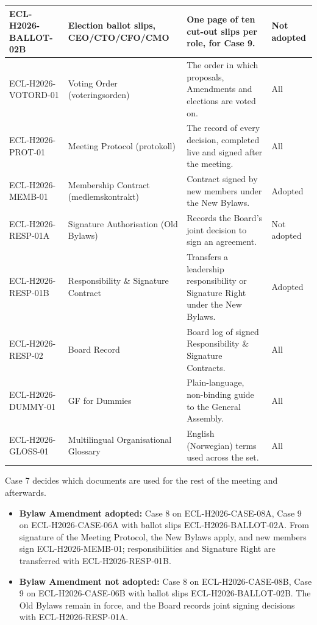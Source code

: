 \documentclass{../../../Common/Latex/Templates/rapport}
\begin{document}
\begin{longtable}{|L{3.2cm}|L{3.6cm}|L{5.3cm}|L{1.9cm}|}
  \hline
  ECL-H2026-BALLOT-02B & Election ballot slips, CEO/CTO/CFO/CMO         & One page of ten cut-out slips per role, for Case 9.                                           & Not adopted \\
  \hline
  ECL-H2026-VOTORD-01 & Voting Order (voteringsorden)                   & The order in which proposals, Amendments and elections are voted on.                          & All \\
  \hline
  ECL-H2026-PROT-01   & Meeting Protocol (protokoll)                    & The record of every decision, completed live and signed after the meeting.                    & All \\
  \hline
  ECL-H2026-MEMB-01   & Membership Contract (medlemskontrakt)           & Contract signed by new members under the New Bylaws.                                          & Adopted \\
  \hline
  ECL-H2026-RESP-01A  & Signature Authorisation (Old Bylaws)            & Records the Board's joint decision to sign an agreement.                                      & Not adopted \\
  \hline
  ECL-H2026-RESP-01B  & Responsibility \& Signature Contract            & Transfers a leadership responsibility or Signature Right under the New Bylaws.                & Adopted \\
  \hline
  ECL-H2026-RESP-02   & Board Record                                    & Board log of signed Responsibility \& Signature Contracts.                                     & All \\
  \hline
  ECL-H2026-DUMMY-01  & GF for Dummies                                  & Plain-language, non-binding guide to the General Assembly.                                    & All \\
  \hline
  ECL-H2026-GLOSS-01  & Multilingual Organisational Glossary            & English (Norwegian) terms used across the set.                                                & All \\
  \hline
\end{longtable}
\endgroup

Case 7 decides which documents are used for the rest of the meeting and afterwards.
\begin{itemize}
  \item \textbf{Bylaw Amendment adopted:} Case 8 on ECL-H2026-CASE-08A, Case 9 on ECL-H2026-CASE-06A with ballot slips ECL-H2026-BALLOT-02A. From signature of the Meeting Protocol, the New Bylaws apply, and new members sign ECL-H2026-MEMB-01; responsibilities and Signature Right are transferred with ECL-H2026-RESP-01B.
  \item \textbf{Bylaw Amendment not adopted:} Case 8 on ECL-H2026-CASE-08B, Case 9 on ECL-H2026-CASE-06B with ballot slips ECL-H2026-BALLOT-02B. The Old Bylaws remain in force, and the Board records joint signing decisions with ECL-H2026-RESP-01A.
\end{itemize}
\end{document}
